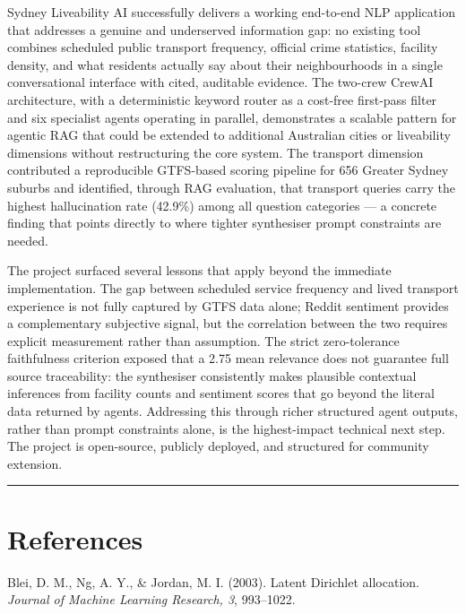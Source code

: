 \documentclass[11pt,a4paper]{article}
\begin{document}
Sydney Liveability AI successfully delivers a working end-to-end NLP application that addresses a genuine and underserved information gap: no existing tool combines scheduled public transport frequency, official crime statistics, facility density, and what residents actually say about their neighbourhoods in a single conversational interface with cited, auditable evidence. The two-crew CrewAI architecture, with a deterministic keyword router as a cost-free first-pass filter and six specialist agents operating in parallel, demonstrates a scalable pattern for agentic RAG that could be extended to additional Australian cities or liveability dimensions without restructuring the core system. The transport dimension contributed a reproducible GTFS-based scoring pipeline for 656 Greater Sydney suburbs and identified, through RAG evaluation, that transport queries carry the highest hallucination rate (42.9\%) among all question categories --- a concrete finding that points directly to where tighter synthesiser prompt constraints are needed.

The project surfaced several lessons that apply beyond the immediate implementation. The gap between scheduled service frequency and lived transport experience is not fully captured by GTFS data alone; Reddit sentiment provides a complementary subjective signal, but the correlation between the two requires explicit measurement rather than assumption. The strict zero-tolerance faithfulness criterion exposed that a 2.75 mean relevance does not guarantee full source traceability: the synthesiser consistently makes plausible contextual inferences from facility counts and sentiment scores that go beyond the literal data returned by agents. Addressing this through richer structured agent outputs, rather than prompt constraints alone, is the highest-impact technical next step. The project is open-source, publicly deployed, and structured for community extension.

\begin{center}\rule{0.5\linewidth}{0.5pt}\end{center}

\clearpage
\section{References}\label{10-references}

Blei, D. M., Ng, A. Y., \& Jordan, M. I. (2003). Latent Dirichlet allocation. \emph{Journal of Machine Learning Research, 3}, 993--1022.
\end{document}
